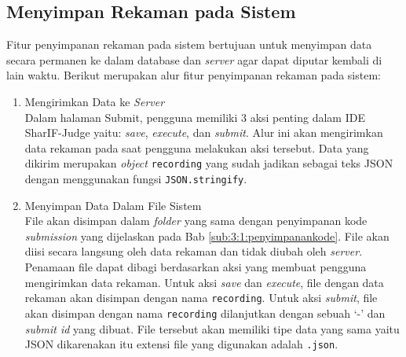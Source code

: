 \subsection{Menyimpan Rekaman pada Sistem}
\label{sub:5:2:storerekaman}

Fitur penyimpanan rekaman pada sistem bertujuan untuk menyimpan data secara permanen ke dalam database dan \textit{server} agar dapat diputar kembali di lain waktu. Berikut merupakan alur fitur penyimpanan rekaman pada sistem:

\begin{enumerate}
    \item Mengirimkan Data ke \textit{Server} \\
    Dalam halaman Submit, pengguna memiliki 3 aksi penting dalam IDE SharIF-Judge yaitu: \textit{save}, \textit{execute}, dan \textit{submit}. Alur ini akan mengirimkan data rekaman pada saat pengguna melakukan aksi tersebut. Data yang dikirim merupakan \textit{object} \verb|recording| yang sudah jadikan sebagai teks JSON dengan menggunakan fungsi \verb|JSON.stringify|.

    \item Menyimpan Data Dalam File Sistem \\
    File akan disimpan dalam \textit{folder} yang sama dengan penyimpanan kode \textit{submission} yang dijelaskan pada Bab \ref{sub:3:1:penyimpanankode}. File akan diisi secara langsung oleh data rekaman dan tidak diubah oleh \textit{server}. Penamaan file dapat dibagi berdasarkan aksi yang membuat pengguna mengirimkan data rekaman. Untuk aksi \textit{save} dan \textit{execute}, file dengan data rekaman akan disimpan dengan nama \verb|recording|. Untuk aksi \textit{submit}, file akan disimpan dengan nama \verb|recording| dilanjutkan dengan sebuah `-' dan \textit{submit id} yang dibuat. File tersebut akan memiliki tipe data yang sama yaitu JSON dikarenakan itu extensi file yang digunakan adalah \verb|.json|.
 

\end{enumerate}
